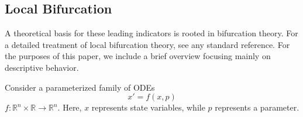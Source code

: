 



\subsection{Local Bifurcation}

A theoretical basis for these leading indicators is rooted in bifurcation theory. For a detailed treatment of local bifurcation theory, see any standard reference. For the purposes of this paper, we include a brief overview focusing mainly on descriptive behavior. 

Consider a parameterized family of ODEs
%
\begin{equation}
	x' = f(x, p)
\end{equation}
%
$f: \mathbb{R}^n \times \mathbb{R} \to \mathbb{R}^n$. Here, $x$ represents state variables, while $p$ represents a parameter. 

%

